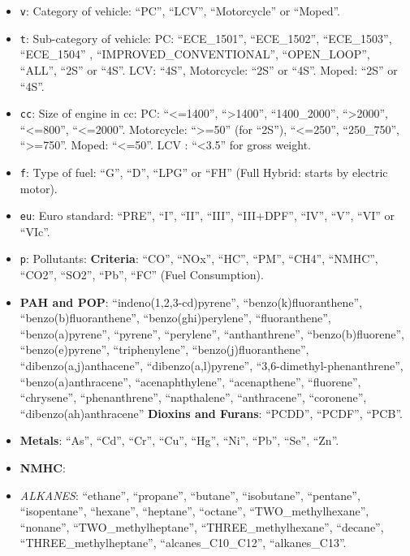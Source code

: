 \documentclass[12pt,graybox,envcountchap,sectrefs]{krantz}
\providecommand{\tightlist}{%
  \setlength{\itemsep}{0pt}\setlength{\parskip}{0pt}}
\theoremstyle{definition}
\theoremstyle{definition}
\theoremstyle{definition}
\theoremstyle{remark}
\begin{document}
\begin{itemize}
\tightlist
\item
  \texttt{v}: Category of vehicle: ``PC'', ``LCV'', ``Motorcycle'' or
  ``Moped''.
\item
  \texttt{t}: Sub-category of vehicle: PC: ``ECE\_1501'', ``ECE\_1502'',
  ``ECE\_1503'', ``ECE\_1504'' , ``IMPROVED\_CONVENTIONAL'',
  ``OPEN\_LOOP'', ``ALL'', ``2S'' or ``4S''. LCV: ``4S'', Motorcycle:
  ``2S'' or ``4S''. Moped: ``2S'' or ``4S''.
\item
  \texttt{cc}: Size of engine in cc: PC: ``\textless{}=1400'',
  ``\textgreater{}1400'', ``1400\_2000'', ``\textgreater{}2000'',
  ``\textless{}=800'', ``\textless{}=2000''. Motorcycle:
  ``\textgreater{}=50'' (for ``2S''), ``\textless{}=250'', ``250\_750'',
  ``\textgreater{}=750''. Moped: ``\textless{}=50''. LCV :
  ``\textless{}3.5'' for gross weight.
\item
  \texttt{f}: Type of fuel: ``G'', ``D'', ``LPG'' or ``FH'' (Full
  Hybrid: starts by electric motor).
\item
  \texttt{eu}: Euro standard: ``PRE'', ``I'', ``II'', ``III'',
  ``III+DPF'', ``IV'', ``V'', ``VI'' or ``VIc''.
\item
  \texttt{p}: Pollutants: \textbf{Criteria}: ``CO'', ``NOx'', ``HC'',
  ``PM'', ``CH4'', ``NMHC'', ``CO2'', ``SO2'', ``Pb'', ``FC'' (Fuel
  Consumption).
\item
  \textbf{PAH and POP}: ``indeno(1,2,3-cd)pyrene'',
  ``benzo(k)fluoranthene'', ``benzo(b)fluoranthene'',
  ``benzo(ghi)perylene'', ``fluoranthene'', ``benzo(a)pyrene'',
  ``pyrene'', ``perylene'', ``anthanthrene'', ``benzo(b)fluorene'',
  ``benzo(e)pyrene'', ``triphenylene'', ``benzo(j)fluoranthene'',
  ``dibenzo(a,j)anthacene'', ``dibenzo(a,l)pyrene'',
  ``3,6-dimethyl-phenanthrene'', ``benzo(a)anthracene'',
  ``acenaphthylene'', ``acenapthene'', ``fluorene'', ``chrysene'',
  ``phenanthrene'', ``napthalene'', ``anthracene'', ``coronene'',
  ``dibenzo(ah)anthracene'' \textbf{Dioxins and Furans}: ``PCDD'',
  ``PCDF'', ``PCB''.
\item
  \textbf{Metals}: ``As'', ``Cd'', ``Cr'', ``Cu'', ``Hg'', ``Ni'',
  ``Pb'', ``Se'', ``Zn''.
\item
  \textbf{NMHC}:
\item
  \emph{ALKANES}: ``ethane'', ``propane'', ``butane'', ``isobutane'',
  ``pentane'', ``isopentane'', ``hexane'', ``heptane'', ``octane'',
  ``TWO\_methylhexane'', ``nonane'', ``TWO\_methylheptane'',
  ``THREE\_methylhexane'', ``decane'', ``THREE\_methylheptane'',
  ``alcanes\_C10\_C12'', ``alkanes\_C13''.

\end{itemize}
\end{document}
